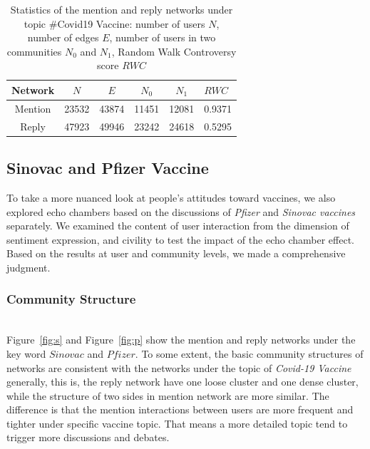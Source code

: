 \documentclass[sigplan,screen]{acmart}
\begin{document}
\begin{table}
  \caption{Statistics of the mention and reply networks under topic \#Covid19 Vaccine: number of users $N$, number of edges $E$, number of users in two communities $N_0$ and $N_1$, Random Walk Controversy score $RWC$}
  \label{tab: v_rwc}
  \begin{tabular}{cccccl}
    \toprule
    Network & $N$ & $E$ & $N_0$ & $N_1$ & $RWC$\\
    \midrule
    Mention & 23532 & 43874 & 11451 & 12081 & 0.9371\\
    Reply & 47923 & 49946 & 23242 & 24618 & 0.5295\\
  \bottomrule
\end{tabular}
\end{table}


\subsection{Sinovac and Pfizer Vaccine}
To take a more nuanced look at people's attitudes toward vaccines, we also explored echo chambers based on the discussions of \textit{Pfizer} and \textit{Sinovac vaccines} separately. We examined the content of user interaction from the dimension of sentiment expression, and civility to test the impact of the echo chamber effect. Based on the results at user and community levels, we made a comprehensive judgment.

\subsubsection{Community Structure}
~\\
Figure~\ref{fig:s} and Figure~\ref{fig:p} show the mention and reply networks under the key word $Sinovac$ and $Pfizer$. To some extent, the basic community structures of networks are consistent with the networks under the topic of \textit{Covid-19 Vaccine} generally, this is, the reply network have one loose cluster and one dense cluster, while the structure of two sides in mention network are more similar. The difference is that the mention interactions between users are more frequent and tighter under specific vaccine topic. That means a more detailed topic tend to trigger more discussions and debates.
\end{document}
